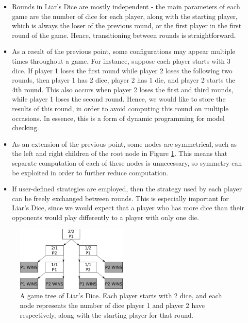 \begin{itemize}
    \item Rounds in Liar's Dice are mostly independent - the main parameters of each game are the number of dice for each player, along with the starting player, which is always the loser of the previous round, or the first player in the first round of the game. Hence, transitioning between rounds is straightforward. %
    \item As a result of the previous point, some configurations may appear multiple times throughout a game. For instance, suppose each player starts with 3 dice. If player 1 loses the first round while player 2 loses the following two rounds, then player 1 has 2 dice, player 2 has 1 die, and player 2 starts the 4th round. This also occurs when player 2 loses the first and third rounds, while player 1 loses the second round. Hence, we would like to store the results of this round, in order to avoid computing this round on multiple occasions. In essence, this is a form of dynamic programming for model checking.
    \item As an extension of the previous point, some nodes are symmetrical, such as the left and right children of the root node in Figure \ref{cs2:2_dice_game_tree}. This means that separate computation of each of these nodes is unnecessary, so symmetry can be exploited in order to further reduce computation.
    \item If user-defined strategies are employed, then the strategy used by each player can be freely exchanged between rounds. This is especially important for Liar's Dice, since we would expect that a player who has more dice than their opponents would play differently to a player with only one die.
\end{itemize}

\begin{figure}[h]
    \centering
    \includegraphics[width=0.5\textwidth]{images/LiarsDice/2_dice_game_tree.pdf}
    \caption{A game tree of Liar's Dice. Each player starts with 2 dice, and each node represents the number of dice player 1 and player 2 have respectively, along with the starting player for that round.}
    \label{cs2:2_dice_game_tree}
\end{figure}

